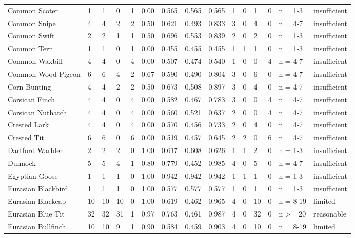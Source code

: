 \begin{landscape}
\begin{longtable}{L{3.6cm}*{12}{C{0.90cm}}L{1.45cm}L{1.65cm}}
Common Scoter & 1 & 1 & 0 & 1 & 0.00 & 0.565 & 0.565 & 0.565 & 1 & 0 & 1 & 0 & n = 1-3 & insufficient \\
Common Snipe & 4 & 4 & 2 & 2 & 0.50 & 0.621 & 0.493 & 0.833 & 3 & 0 & 4 & 0 & n = 4-7 & insufficient \\
Common Swift & 2 & 2 & 1 & 1 & 0.50 & 0.696 & 0.553 & 0.839 & 2 & 0 & 2 & 0 & n = 1-3 & insufficient \\
Common Tern & 1 & 1 & 0 & 1 & 0.00 & 0.455 & 0.455 & 0.455 & 1 & 1 & 1 & 0 & n = 1-3 & insufficient \\
Common Waxbill & 4 & 4 & 0 & 4 & 0.00 & 0.507 & 0.474 & 0.540 & 1 & 0 & 0 & 4 & n = 4-7 & insufficient \\
Common Wood-Pigeon & 6 & 6 & 4 & 2 & 0.67 & 0.590 & 0.490 & 0.804 & 3 & 0 & 6 & 0 & n = 4-7 & insufficient \\
Corn Bunting & 4 & 4 & 2 & 2 & 0.50 & 0.673 & 0.508 & 0.897 & 3 & 0 & 4 & 0 & n = 4-7 & insufficient \\
Corsican Finch & 4 & 4 & 0 & 4 & 0.00 & 0.582 & 0.467 & 0.783 & 3 & 0 & 0 & 4 & n = 4-7 & insufficient \\
Corsican Nuthatch & 4 & 4 & 0 & 4 & 0.00 & 0.560 & 0.521 & 0.637 & 2 & 0 & 0 & 4 & n = 4-7 & insufficient \\
Crested Lark & 4 & 4 & 0 & 4 & 0.00 & 0.570 & 0.456 & 0.733 & 2 & 0 & 4 & 0 & n = 4-7 & insufficient \\
Crested Tit & 6 & 6 & 0 & 6 & 0.00 & 0.519 & 0.457 & 0.645 & 2 & 2 & 0 & 6 & n = 4-7 & insufficient \\
Dartford Warbler & 2 & 2 & 2 & 0 & 1.00 & 0.617 & 0.608 & 0.626 & 1 & 1 & 2 & 0 & n = 1-3 & insufficient \\
Dunnock & 5 & 5 & 4 & 1 & 0.80 & 0.779 & 0.452 & 0.985 & 4 & 0 & 5 & 0 & n = 4-7 & insufficient \\
Egyptian Goose & 1 & 1 & 1 & 0 & 1.00 & 0.942 & 0.942 & 0.942 & 1 & 1 & 1 & 0 & n = 1-3 & insufficient \\
Eurasian Blackbird & 1 & 1 & 1 & 0 & 1.00 & 0.577 & 0.577 & 0.577 & 1 & 0 & 1 & 0 & n = 1-3 & insufficient \\
Eurasian Blackcap & 10 & 10 & 10 & 0 & 1.00 & 0.619 & 0.462 & 0.965 & 4 & 0 & 10 & 0 & n = 8-19 & limited \\
Eurasian Blue Tit & 32 & 32 & 31 & 1 & 0.97 & 0.763 & 0.461 & 0.987 & 4 & 0 & 32 & 0 & n >= 20 & reasonable \\
Eurasian Bullfinch & 10 & 10 & 9 & 1 & 0.90 & 0.584 & 0.459 & 0.903 & 4 & 0 & 10 & 0 & n = 8-19 & limited \\

\end{longtable}
\end{landscape}
